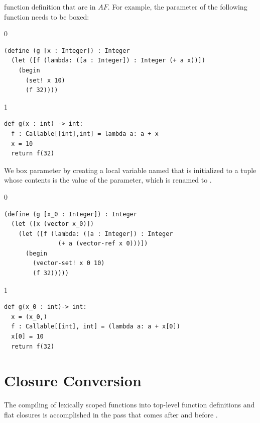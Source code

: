 \documentclass[7x10]{TimesAPriori_MIT}%
\def\racketEd{0}
\def\pythonEd{1}
\providecommand{\BookEdition}{1}
\let\edition\BookEdition
\newcommand{\pythonColor}[0]{}
\numberwithin{theorem}{chapter}
\numberwithin{definition}{chapter}
\numberwithin{equation}{chapter}
\begin{document}
function definition that are in $\mathit{AF}$. For example,
the parameter  of the following function 
needs to be boxed:
{\if\edition\racketEd
\begin{lstlisting}
(define (g [x : Integer]) : Integer
  (let ([f (lambda: ([a : Integer]) : Integer (+ a x))])
    (begin
      (set! x 10)
      (f 32))))
\end{lstlisting}
\fi}
%
{\if\edition\pythonEd\pythonColor
\begin{lstlisting}
def g(x : int) -> int:
  f : Callable[[int],int] = lambda a: a + x
  x = 10
  return f(32)
\end{lstlisting}
\fi}
%
\noindent We box parameter  by creating a local variable named
 that is initialized to a tuple whose contents is the value of
the parameter, which is renamed to .
%
{\if\edition\racketEd
\begin{lstlisting}
(define (g [x_0 : Integer]) : Integer
  (let ([x (vector x_0)])
    (let ([f (lambda: ([a : Integer]) : Integer
               (+ a (vector-ref x 0)))])
      (begin 
        (vector-set! x 0 10)
        (f 32)))))
\end{lstlisting}
\fi}
%
{\if\edition\pythonEd\pythonColor
\begin{lstlisting}
def g(x_0 : int)-> int:
  x = (x_0,)
  f : Callable[[int], int] = (lambda a: a + x[0])
  x[0] = 10
  return f(32)
\end{lstlisting}
\fi}

\section{Closure Conversion}
\label{sec:closure-conversion}

The compiling of lexically scoped functions into top-level function
definitions and flat closures is accomplished in the pass
 that comes after 
and before .
\end{document}
